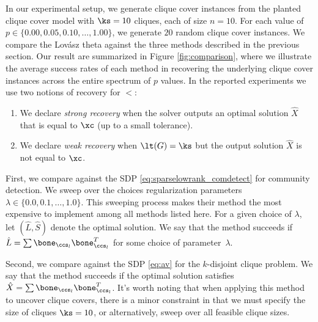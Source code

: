 In our experimental setup, we generate  clique cover  instances from the planted clique cover model  with $\ks=10$ cliques, each of size $n=10$.  For each value of   $p \in \{ 0.00, 0.05, 0.10, \ldots, 1.00 \}$, we generate $20$ random clique cover  instances.  We compare the Lov\'asz theta against the three methods described in the previous section. Our result are summarized in  Figure \ref{fig:comparison},  where we illustrate the average success rates of each method in recovering the underlying clique cover instances across the entire spectrum of $p$ values. In  the reported experiments we use two notions of recovery for $\lt$:
\begin{enumerate}
\item We declare {\em strong recovery}  when the solver outputs an optimal solution $\hat{X}$ that is equal to $\xc$ (up to a small tolerance).
\item We declare {\em weak recovery} when $\lt(G) = \ks$ but the output solution $\hat{X}$ is not equal to $\xc$. \end{enumerate}



%



First, we  compare against  the SDP   \eqref{eq:sparselowrank_comdetect} for community detection.  We sweep over the choices regularization parameters $\lambda \in \{ 0.0, 0.1, \ldots, 1.0 \}$.    This sweeping process makes their method the most expensive to implement among all methods listed here. For a given choice of  $\lambda$, let $(\hat{L},\hat{S})$ denote the optimal solution.  We say that the method succeeds if $\hat{L} = \sum \bone_{\ccs_l}\bone_{\ccs_l}^T$ for some choice of parameter~$\lambda$. 

Second,  we compare against  the SDP \eqref{eq:av} for the $k$-disjoint clique problem.  We say that the method succeeds if the optimal solution satisfies $\hat{X} = \sum \bone_{\ccs_l}\bone_{\ccs_l}^T$. It's worth noting that when applying this method to uncover clique covers, there is a minor constraint in that we must specify the size of cliques $\ks=10$, or alternatively, sweep over all feasible clique sizes.






